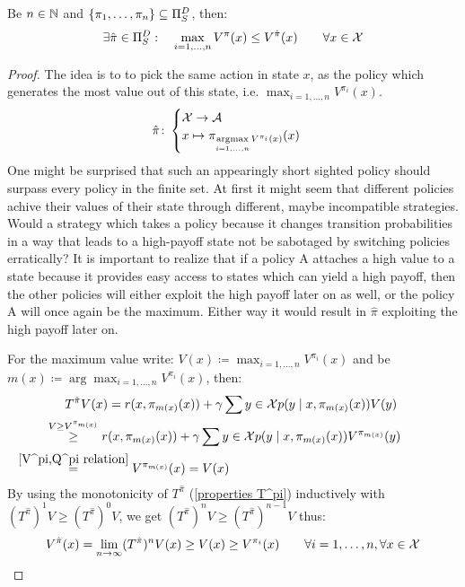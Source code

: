 \begin{prop}\label{finite outmatching}
	Be \(n\in\mathbb{N}\) and \(\{\pi_1,\dots,\pi_n\}\subseteq \Pi_S^D \), then:
	\[\exists \hat{\pi}\in\Pi_S^D: \quad \max_{i=1,\dots,n} V^\pi(x)\le V^{\hat{\pi}}(x) \qquad \forall x\in\mathcal{X} \]
\end{prop}
\begin{proof}
	The idea is to to pick the same action in state \(x\), as the policy which generates the most value out of this state, i.e. \(\max_{i=1,\dots,n}V^{\pi_i}(x)\). 
	\[
		\hat{\pi}\colon
	\begin{cases} 
		\mathcal{X}\to\mathcal{A}\\
		x\mapsto \pi_{\mathop{\text{argmax}}\limits_{i=1,\dots,n}V^{\pi_i}(x)}(x)
	\end{cases}
	\]
	One might be surprised that such an appearingly short sighted policy should surpass every policy in the finite set. At first it might seem that different policies achive their values of their state through different, maybe incompatible strategies. Would a strategy which takes a policy because it changes transition probabilities in a way that leads to a high-payoff state not be sabotaged by switching policies erratically?
	It is important to realize that if a policy A attaches a high value to a state because it provides easy access to states which can yield a high payoff, then the other policies will either exploit the high payoff later on as well, or the policy A will once again be the maximum. Either way it would result in \(\hat{\pi}\) exploiting the high payoff later on. 

	For the maximum value write: \(V(x)\coloneqq \max_{i=1,\dots, n}V^{\pi_i}(x)\) and be \(m(x) \coloneqq \arg\max_{i=1,\dots,n}V^{\pi_i}(x)\), then:
	\begin{align*}
		&T^{\hat{\pi}}V(x)=r(x,\pi_{m(x)}(x))
		+\gamma \sum{y\in\cX} p(y\mid x,\pi_{m(x)}(x))V(y)\\
		&\lxgq{V\ge V^{\pi_{m(x)}}} r(x,\pi_{m(x)}(x))
		+\gamma \sum{y\in\cX} p(y\mid x,\pi_{m(x)}(x))V^{\pi_{m(x)}}(y)\\
		&\lxeq{\ref{V^pi,Q^pi relation}} V^{\pi_{m(x)}}(x)=V(x)
	\end{align*}
	By using the monotonicity of \(T^{\hat{\pi}} \) (\ref{properties T^pi}) inductively with \((T^{\hat{\pi}})^1 V \ge (T^{\hat{\pi}})^0 V \), we get
	\( (T^{\hat{\pi}})^n V \ge (T^{\hat{\pi}})^{n-1} V \) thus:
	\[
		V^{\hat{\pi}}(x) = \lim_{n\to\infty} (T^{\hat{\pi}})^n V(x) 
		\ge V(x) \ge V^{\pi_i}(x)
		\qquad \forall i=1,\dots,n, \forall x\in\mathcal{X}
		\qedhere
	\] 
\end{proof}

